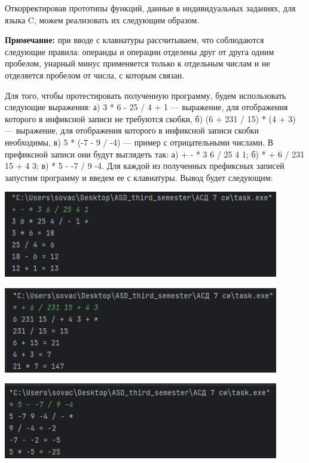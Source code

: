 \documentclass[12pt]{article}
\begin{document}
{	Откорректировав прототипы функций, данные в индивидуальных заданиях, для языка C, можем реализовать их следующим образом.
	
	{\bf Примечание:} при вводе с клавиатуры рассчитываем, что соблюдаются следующие правила: операнды и операции отделены друг от друга одним пробелом, унарный минус применяется только к отдельным числам и не отделяется пробелом от числа, с которым связан.
	
	 
	
	Для того, чтобы протестировать полученную программу, будем использовать следующие выражения: а) 3 * 6 - 25 / 4 + 1 --- выражение, для отображения которого в инфиксной записи не требуются скобки, б) (6 + 231 / 15) * (4 + 3) --- выражение, для отображения которого в инфиксной записи скобки необходимы, в) 5 * (-7 - 9 / -4) --- пример с отрицательными числами. В префиксной записи они будут выглядеть так: а) + - * 3 6 / 25 4 1; б) * + 6 / 231 15 + 4 3; в) * 5 - -7 / 9 -4. Для каждой из полученных префиксных записей запустим программу и введем ее с клавиатуры. Вывод будет следующим:
	
	\includegraphics[width=120mm]{images/expression1.png} 
	
	\includegraphics[width=120mm]{images/expression2.png} 
	
	\includegraphics[width=120mm]{images/expression3.png} 
	
}
\end{document}
